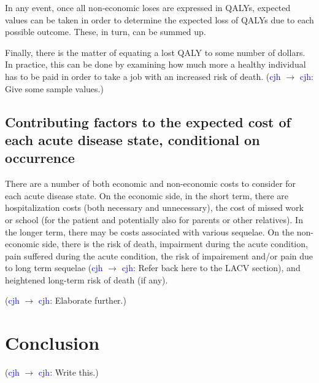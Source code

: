 \documentclass[12pt]{article}
\newcommand{\cjh}{\textcolor{blue}{cjh}}
\newcommand{\msg}[3]{(#1 $\rightarrow$ #2: #3)}
\newcommand{\mcc}[1]{\msg\cjh\cjh{#1}}
\begin{document}
            In any event, once all non-economic loses are expressed in QALYs, expected values can be taken in order to determine the expected loss of QALYs due to each possible outcome. These, in turn, can be summed up.

            Finally, there is the matter of equating a lost QALY to some number of dollars. In practice, this can be done by examining how much more a healthy individual has to be paid in order to take a job with an increased risk of death. \mcc{Give some sample values.}

        \subsection{Contributing factors to the expected cost of each acute disease state, conditional on occurrence}
            There are a number of both economic and non-economic costs to consider for each acute disease state. On the economic side, in the short term, there are hospitalization costs (both necessary and unnecessary), the cost of missed work or school (for the patient and potentially also for parents or other relatives). In the longer term, there may be costs associated with various sequelae. On the non-economic side, there is the risk of death, impairment during the acute condition, pain suffered during the acute condition, the risk of impairement and/or pain due to long term sequelae \mcc{Refer back here to the LACV section}, and heightened long-term risk of death (if any).

            \mcc{Elaborate further.}

    \section{Conclusion}
        \mcc{Write this.}
\end{document}
